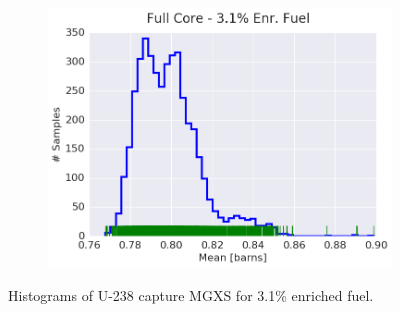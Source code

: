 \begin{figure}[h!]
\begin{subfigure}{0.5\textwidth}
  \includegraphics[width=\linewidth]{figures/patterns/full-core/hist-kde-rug/31-enr-capt-1} \caption{}
  \label{fig:chap9-hist-full-core-3.1-capt}
\end{subfigure}
\caption[Histogram of U-238 capture MGXS for 3.1\% enriched fuel]{Histograms of U-238 capture \ac{MGXS} for 3.1\% enriched fuel.}
\label{fig:chap9-hist-3.1-capt}
\end{figure}


